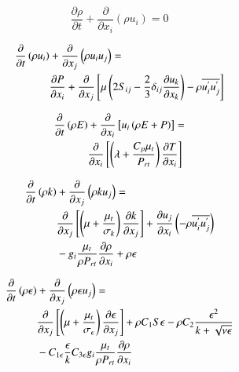 \documentclass[preprint,12pt]{elsarticle}
\begin{document}
\begin{equation}
\frac{\partial \rho }{\partial t } + \frac{\partial }{\partial x_i} \left( \rho u_i \right) = 0 
\label{eq:mass}
\end{equation}

\begin{equation}
\centering
\begin{split}
\frac{\partial }{\partial t} \left( \rho u_i \right) &+ \frac{\partial }{\partial x_j } \left( \rho u_i u_j \right) = \\
 &\frac{\partial P}{\partial x_i } + \frac{\partial }{\partial x_j } \left[ \mu \left( 2 S_{ij} - \frac{2}{3} \delta_{ij} \frac{\partial u_k }{\partial x_k } \right) - \rho \overline{u^{'}_{i} u^{'}_{j}} \right] 
\label{eq:momentum}
\end{split}
\end{equation}

\begin{equation}
\centering
\begin{split}
\frac{\partial }{\partial t } \left( \rho E \right) &+ \frac{\partial }{\partial x_i} \left[ u_i \left( \rho E + P \right) \right] = \\
 &\frac{\partial }{\partial x_i } \left[ \left( \lambda + \frac{C_p \mu_t }{P_{rt}} \right) \frac{\partial T}{\partial x_i} \right] 
\label{eq:energy}
\end{split}
\end{equation}

\begin{equation}
\centering
\begin{split}
\frac{\partial }{\partial t} \left(\rho k \right) &+ \frac{\partial }{\partial x_j} \left( \rho k u_j \right) = \\
&\frac{\partial }{\partial x_j} \left[ \left( \mu + \frac{\mu_t}{\sigma_k} \right) \frac{\partial k}{\partial x_j} \right] + \frac{\partial u_j}{\partial x_i} \left( -\rho \overline{u^{'}_{i} u^{'}_{j}} \right) \\
&- g_i \frac{\mu_t}{\rho P_{rt}} \frac{\partial \rho }{\partial x_i} + \rho \epsilon
\label{eq:k}
\end{split}
\end{equation}

\begin{equation}
\centering
\begin{split}
 \frac{\partial }{\partial t} \left(\rho \epsilon \right) &+ \frac{\partial }{\partial x_j} \left( \rho \epsilon u_j \right) = \\
 &\frac{\partial }{\partial x_j } \left[ \left( \mu + \frac{\mu_t }{\sigma_\epsilon } \right) \frac{\partial \epsilon }{\partial x_j } \right] + \rho C_1 S \epsilon - \rho C_2 \frac{\epsilon^2 }{k+\sqrt{\nu \epsilon}} \\
 &- C_{1 \epsilon} \frac{\epsilon}{k} C_{3\epsilon} g_i \frac{\mu_t}{\rho P_{rt}} \frac{\partial \rho}{\partial x_i}
\label{eq:e}
\end{split}
\end{equation}
\end{document}
